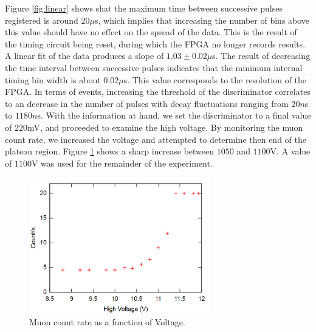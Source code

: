 \documentclass[12pt]{article}
\begin{document}
Figure \ref{fig:linear} shows shat the maximum time between successive pulses registered is around $20\mu$s, which implies that increasing the number of bins above this value should have no effect on the spread of the data. This is the result of the timing circuit being reset, during which the FPGA no longer records results. A linear fit of the data produces a slope of $1.03 \pm 0.02 \mu$s. The result of decreasing the time interval between successive pulses indicates that the minimum internal timing bin width is about $0.02\mu$s. This value corresponds to the resolution of the FPGA.  In terms of events, increasing the threshold of the discriminator correlates to an decrease in the number of pulses with decay fluctuations ranging from $20n$s to $1180n$s. With the information at hand, we set the discriminator to a final value of $220$mV, and proceeded to examine the high voltage. By monitoring the muon count rate, we increased the voltage and attempted to determine then end of the plateau region. Figure \ref{fig:HV} shows a sharp increase between $1050$ and $1100$V. A value of $1100$V was used for the remainder of the experiment.
\begin{figure}[h]
\begin{center}
 \quad \includegraphics[width=0.7\textwidth]{gnuHV}
\end{center}
\caption{Muon count rate as a function of Voltage.}
\label{fig:HV}
\end{figure}
\end{document}
